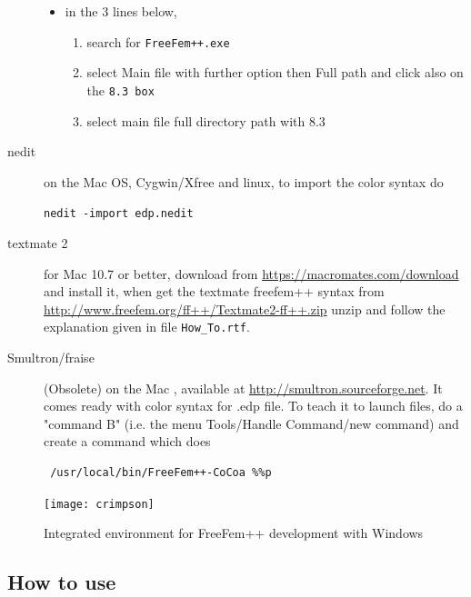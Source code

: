\documentclass[a4paper,twoside,12pt]{book}
\begin{document}
\begin{description}
\begin{itemize}
\item in the 3 lines below,
\begin{enumerate}
\item search for \texttt{FreeFem++.exe}
\item select Main file with further option then Full path and click also on the \texttt{8.3 box}
\item select main file full directory path with 8.3
\end{enumerate}
\end{itemize}
\item[nedit] on the Mac OS, Cygwin/Xfree and linux, to import the color syntax do

\verb!nedit -import edp.nedit!

 \item[textmate 2] for  Mac 10.7 or better, download from \url{https://macromates.com/download} and install it, when  get the textmate freefem++ syntax from
  \url{http://www.freefem.org/ff++/Textmate2-ff++.zip} unzip and follow the explanation given in file \texttt{How\_To.rtf}.
  
 \item[Smultron/fraise] (Obsolete) on the Mac , available at \url{http://smultron.sourceforge.net}. It comes ready with color syntax for .edp file.  To teach it to launch \freefempp files, do a "command B" (i.e. the menu Tools/Handle Command/new command) and create a command which does
\begin{verbatim}
 /usr/local/bin/FreeFem++-CoCoa %%p
\end{verbatim}

\end{description}
%
\begin{figure}[htbp]
\begin{center}
\texttt{[image: crimpson]}
\caption{ Integrated environment for FreeFem++ development with Windows
   \label{fig:mi}}
\end{center}
\end{figure}


\subsection{How to use \freefempp}

\end{document}
